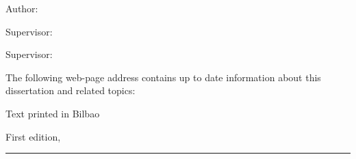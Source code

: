 
\thispagestyle{empty}

\hfill

\vfill

\medskip


\noindent
\textit{
\Title
}


Author: \Author

Supervisor: \Advisor

Supervisor: \Advisortwo


\vfill




\vfill


\noindent
The following web-page address contains up to date information about this dissertation and related topics: \\
\website


\noindent
Text printed in Bilbao

\noindent
First edition, 
\monthname \ \the\year

\vspace{1cm}
\hrule
\bigskip

\cleardoublepage

%
%
%
%
%
%

